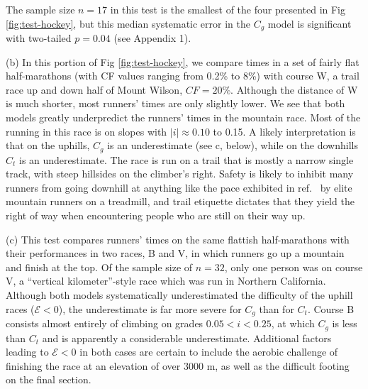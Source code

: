 \documentclass[10pt,letterpaper]{article}
\begin{document}
The sample size $n=17$ in this test is the smallest of the four presented in Fig \ref{fig:test-hockey},
but this median systematic error in the $C_g$ model is significant with two-tailed $p=0.04$ (see Appendix 1).


(b) In this portion of Fig \ref{fig:test-hockey}, we compare times in a set of fairly flat half-marathons
(with CF values ranging from 0.2\% to 8\%) with course W, a trail race up and down half of Mount Wilson, $CF=20\%$.
Although the distance of W is much shorter, most runners' times are only slightly lower. We see that both
models greatly underpredict the runners' times in the mountain race. Most of the running in this race is
on slopes with $|i|\approx 0.10$ to 0.15. A likely interpretation is that on the uphills, $C_g$ is an
underestimate (see c, below), while on the downhills $C_t$ is an underestimate. The race is run on a trail that is
mostly a narrow single track, with steep hillsides on the climber's right. Safety is likely to inhibit
many runners from going downhill at anything like the pace exhibited in ref.~\cite{minetti} by elite mountain runners
on a treadmill, and trail etiquette dictates that they yield the right of way when encountering
people who are still on their way up.

(c) This test compares runners' times on the same flattish half-marathons with their performances in
two races, B and V, in which runners go up a mountain and finish at the top. Of the sample size of $n=32$, only
one person was on course V, a ``vertical kilometer''-style race which was run in Northern California.
Although both models systematically underestimated the difficulty of the uphill races ($\mathcal{E}<0$),
the underestimate is far more severe for $C_g$ than for $C_t$. Course B consists almost
entirely of climbing on grades $0.05<i<0.25$, at which $C_g$ is less than $C_t$ and is apparently a
considerable underestimate. Additional factors leading to $\mathcal{E}<0$ in both cases
are certain to include the aerobic challenge of finishing the race at an elevation of over 3000 m,
as well as the difficult footing on the final section.
\end{document}
